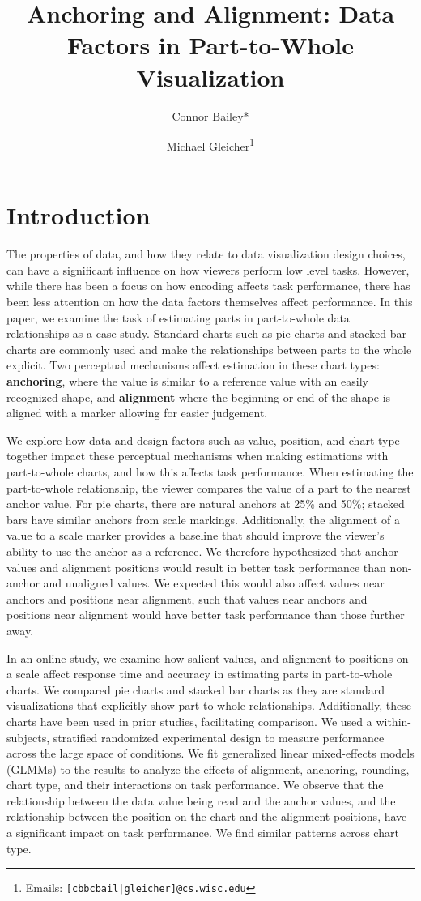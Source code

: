 \documentclass[preprint]{vgtc}               %
\title{Anchoring and Alignment: Data Factors in Part-to-Whole Visualization}
\author{Connor Bailey* \and Michael Gleicher\thanks{Emails: \texttt{[cbbcbail|gleicher]@cs.wisc.edu}}}
\affiliation{\scriptsize University of Wisconsin-Madison}
\begin{document}
\maketitle

\section{Introduction} 
The properties of data, and how they relate to data visualization design choices, can have a significant influence on how viewers perform low level tasks. 
However, while there has been a focus on how encoding affects task performance, there has been less attention on how the data factors themselves affect performance. 
In this paper, we examine the task of estimating parts in part-to-whole data relationships as a case study. 
Standard charts such as pie charts and stacked bar charts are commonly used and make the relationships between parts to the whole explicit.
Two perceptual mechanisms affect estimation in these chart types: \textbf{anchoring}, where the value is similar to a reference value with an easily recognized shape, and \textbf{alignment} where the beginning or end of the shape is aligned with a marker allowing for easier judgement.

We explore how data and design factors such as value, position, and chart type together impact these perceptual mechanisms when making estimations with part-to-whole charts, and how this affects task performance.
When estimating the part-to-whole relationship, the viewer compares the value of a part to the nearest anchor value. 
For pie charts, there are natural anchors at 25\% and 50\%; stacked bars have similar anchors from scale markings. 
Additionally, the alignment of a value to a scale marker provides a baseline that should improve the viewer's ability to use the anchor as a reference. 
We therefore hypothesized that anchor values and alignment positions would result in better task performance than non-anchor and unaligned values.
We expected this would also affect values near anchors and positions near alignment, such that values near anchors and positions near alignment would have better task performance than those further away.

In an online study, we examine how salient values, and alignment to positions on a scale affect response time and accuracy in estimating parts in part-to-whole charts. 
We compared pie charts and stacked bar charts as they are standard visualizations that explicitly show part-to-whole relationships.
Additionally, these charts have been used in prior studies, facilitating comparison.
We used a within-subjects, stratified randomized experimental design to measure performance across the large space of conditions.
We fit generalized linear mixed-effects models (GLMMs) to the results to analyze the effects of alignment, anchoring, rounding, chart type, and their interactions on task performance.
We observe that the relationship between the data value being read and the anchor values, and the relationship between the position on the chart and the alignment positions, have a significant impact on task performance.
We find similar patterns across chart type.
\end{document}
